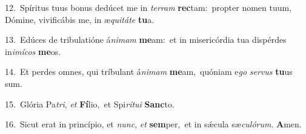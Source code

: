 {\numbfont\textcolor{\numbcolor}{12.}}~Spíritus tuus bonus dedúcet me in \textit{ter}\-\textit{ram} \textbf{rec}\-tam:~\star propter nomen tuum, Dómine, vivificábis me, in æ\-\textit{qui}\-\textit{tá}\textit{te} \textbf{tu}\-a.\par
{\numbfont\textcolor{\numbcolor}{13.}}~Edúces de tribulatióne á\-\textit{ni}\-\textit{mam} \textbf{me}\-am:~\star et in misericórdia tua dispérdes in\-\textit{i}\-\textit{mí}\textit{cos} \textbf{me}\-os.\par
{\numbfont\textcolor{\numbcolor}{14.}}~Et perdes omnes, qui tríbulant á\-\textit{ni}\-\textit{mam} \textbf{me}\-am,~\star quóniam e\textit{go} \textit{ser}\-\textit{vus} \textbf{tu}\-us sum.\par
{\numbfont\textcolor{\numbcolor}{15.}}~Glória Pa\-\textit{tri}\-, \textit{et} \textbf{Fí}\-lio,~\star et Spi\-\textit{rí}\-\textit{tu}\textit{i} \textbf{Sanc}\-to.\par
{\numbfont\textcolor{\numbcolor}{16.}}~Sicut erat in princípio, et \textit{nunc}\-, \textit{et} \textbf{sem}\-per,~\star et in sǽcula sæ\-\textit{cu}\-\textit{ló}\textit{rum}. \textbf{A}\-men.\par
